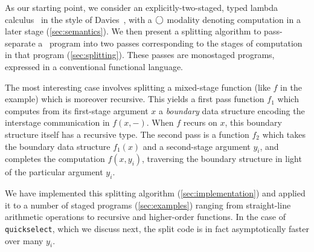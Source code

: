 As our starting point, we consider an explicitly-two-staged, typed lambda
calculus \lang\ in the style of Davies~\cite{davies96}, with a $\bigcirc$ modality
denoting computation in a later stage (\ref{sec:semantics}). We then present a
splitting algorithm to pass-separate a \lang\ program into two passes
corresponding to the stages of computation in that program
(\ref{sec:splitting}). These passes are monostaged programs, expressed in a
conventional functional language.

The most interesting case involves splitting a mixed-stage function (like $f$ in
the example) which is moreover recursive. This yields a first pass function
$f_1$ which computes from its first-stage argument $x$ a \emph{boundary} data
structure encoding the interstage communication in $f(x,-)$. When $f$ recurs on
$x$, this boundary structure itself has a recursive type.
%
The second pass is a function $f_2$ which takes the boundary data structure
$f_1(x)$ and a second-stage argument $y_i$, and completes the computation
$f(x,y_i)$, traversing the boundary structure in light of the particular
argument $y_i$.

We have implemented this splitting algorithm (\ref{sec:implementation}) and
applied it to a number of staged programs (\ref{sec:examples}) ranging from
straight-line arithmetic operations to recursive and higher-order functions. In
the case of \texttt{quickselect}, which we discuss next, the split code is in
fact asymptotically faster over many $y_i$.


